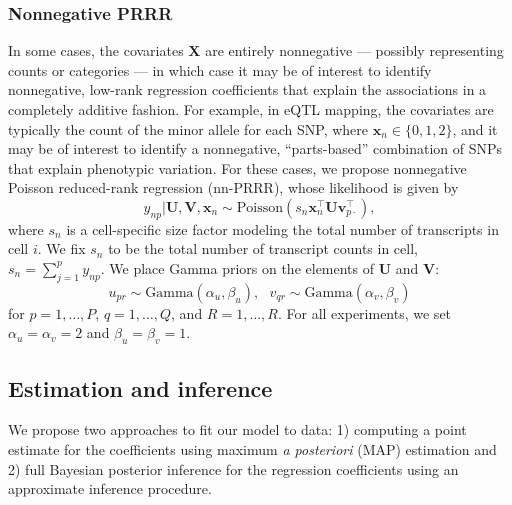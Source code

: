 \documentclass{bmcart}
\begin{document}
\subsubsection*{Nonnegative PRRR}
In some cases, the covariates $\mathbf{X}$ are entirely nonnegative --- possibly representing counts or categories --- in which case it may be of interest to identify nonnegative, low-rank regression coefficients that explain the associations in a completely additive fashion. For example, in eQTL mapping, the covariates are typically the count of the minor allele for each SNP, where $\mathbf{x}_n \in \{0, 1, 2\}$, and it may be of interest to identify a nonnegative, ``parts-based'' combination of SNPs that explain phenotypic variation. For these cases, we propose nonnegative Poisson reduced-rank regression (nn-PRRR), whose likelihood is given by
\begin{equation}
    y_{np} | \mathbf{U}, \mathbf{V}, \mathbf{x}_n \sim \text{Poisson} (s_n \mathbf{x}_n^\top \mathbf{U} \mathbf{v}_{p\cdot}^\top), \label{eq:prrr1}
\end{equation}
where $s_n$ is a cell-specific size factor modeling the total number of transcripts in cell $i$. We fix $s_n$ to be the total number of transcript counts in cell, $s_n = \sum_{j=1}^p y_{np}$. We place Gamma priors on the elements of $\mathbf{U}$ and $\mathbf{V}$:
\begin{equation}
    u_{pr} \sim \text{Gamma}(\alpha_u, \beta_u),~~~v_{qr} \sim \text{Gamma}(\alpha_v, \beta_v)
    \label{eq:prrr3}
\end{equation}
for $p = 1,\dots,P$, $q = 1, \dots, Q$, and $R = 1, \dots, R$. For all experiments, we set $\alpha_u=\alpha_v=2$ and $\beta_u=\beta_v=1$.

\subsection*{Estimation and inference}
We propose two approaches to fit our model to data: 1) computing a point estimate for the coefficients using maximum \emph{a posteriori} (MAP) estimation and 2) full Bayesian posterior inference for the regression coefficients using an approximate inference procedure.
\end{document}
